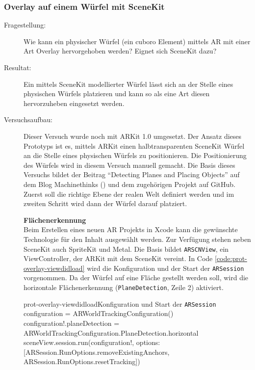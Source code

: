 \subsubsection{Overlay auf einem Würfel mit SceneKit}
\begin{description}
	\item[Fragestellung:] Wie kann ein physischer Würfel (ein cuboro Element) mittels AR mit einer Art Overlay hervorgehoben werden? Eignet sich SceneKit dazu?
	\item[Resultat:] Ein mittels SceneKit modellierter Würfel lässt sich an der Stelle eines physischen Würfels platzieren und kann so als eine Art diesen hervorzuheben eingesetzt werden. %
	\item[Versuchsaufbau:] Dieser Versuch wurde noch mit ARKit 1.0 umgesetzt. Der Ansatz dieses Prototyps ist es, mittels ARKit einen halbtransparenten SceneKit Würfel an die Stelle eines physischen Würfels zu positionieren. Die Positionierung des Würfels wird in diesem Versuch manuell gemacht. Die Basis dieses Versuchs bildet der Beitrag "`Detecting Planes and Placing Objects"' auf dem Blog Machinethinks (\cite{arkit-dectingplanes-placingobjects}) und dem zugehörigen Projekt auf GitHub. Zuerst soll die richtige Ebene der realen Welt definiert werden und im zweiten Schritt wird dann der Würfel darauf platziert.

	\textbf{Flächenerkennung}\\
	Beim Erstellen eines neuen AR Projekts in Xcode kann die gewünschte Technologie für den Inhalt ausgewählt werden. Zur Verfügung stehen neben SceneKit auch SpriteKit und Metal. Die Basis bildet \texttt{ARSCNView}, ein ViewController, der ARKit mit dem SceneKit vereint. In Code \ref{code:prot-overlay-viewdidload} wird die Konfiguration und der Start der \texttt{ARSession} vorgenommen. Da der Würfel auf eine Fläche gestellt werden soll, wird die horizontale Flächenerkennung (\texttt{PlaneDetection}, Zeile 2) aktiviert.

	\begin{code}{prot-overlay-viewdidload}{Konfiguration und Start der \texttt{ARSession}}
		configuration = ARWorldTrackingConfiguration()
		configuration!.planeDetection = ARWorldTrackingConfiguration.PlaneDetection.horizontal
		sceneView.session.run(configuration!, options: [ARSession.RunOptions.removeExistingAnchors, ARSession.RunOptions.resetTracking])
	\end{code}


\end{description}
